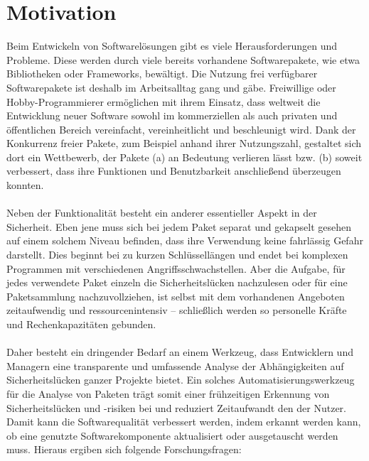 \section{Motivation} \label{subsec:Motivation}
    Beim Entwickeln von Softwarelösungen gibt es viele Herausforderungen und Probleme. 
    Diese werden durch viele bereits vorhandene Softwarepakete, wie etwa Bibliotheken oder Frameworks, bewältigt.
    Die Nutzung frei verfügbarer Softwarepakete ist deshalb im Arbeitsalltag gang und gäbe.
    Freiwillige oder Hobby-Programmierer ermöglichen mit ihrem Einsatz, dass weltweit die Entwicklung neuer Software sowohl im kommerziellen als auch privaten und öffentlichen Bereich vereinfacht, vereinheitlicht und beschleunigt wird.
    Dank der Konkurrenz freier Pakete, zum Beispiel anhand ihrer Nutzungszahl, gestaltet sich dort ein Wettbewerb, der Pakete (a) an Bedeutung verlieren lässt bzw. (b) soweit verbessert, dass ihre Funktionen und Benutzbarkeit anschließend überzeugen konnten.
    \\ \\
    Neben der Funktionalität besteht ein anderer essentieller Aspekt in der Sicherheit.
    Eben jene muss sich bei jedem Paket separat und gekapselt gesehen auf einem solchem Niveau befinden, dass ihre Verwendung keine fahrlässig Gefahr darstellt.
    Dies beginnt bei zu kurzen Schlüssellängen und endet bei komplexen Programmen mit verschiedenen Angriffsschwachstellen.
    Aber die Aufgabe, für jedes verwendete Paket einzeln die Sicherheitslücken nachzulesen oder für eine Paketsammlung nachzuvollziehen, ist selbst mit dem vorhandenen Angeboten zeitaufwendig und ressourcenintensiv -- schließlich werden so personelle Kräfte und Rechenkapazitäten gebunden.
    \\ \\
    Daher besteht ein dringender Bedarf an einem Werkzeug, dass Entwicklern und Managern eine transparente und umfassende Analyse der Abhängigkeiten auf Sicherheitslücken ganzer Projekte bietet.
    Ein solches Automatisierungswerkzeug für die Analyse von Paketen trägt somit einer frühzeitigen Erkennung von Sicherheitslücken und -risiken bei und reduziert Zeitaufwandt den der Nutzer.
    Damit kann die Softwarequalität verbessert werden, indem erkannt werden kann, ob eine genutzte Softwarekomponente aktualisiert oder ausgetauscht werden muss.
    Hieraus ergiben sich folgende Forschungsfragen:
